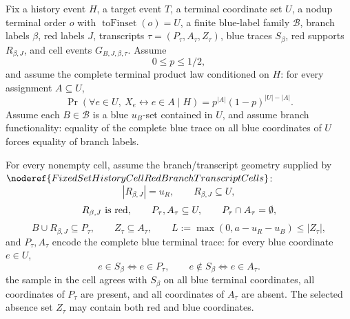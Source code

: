\begin{helper}
Fix a history event \(H\), a target event \(T\), a terminal coordinate set
\(U\), a nodup terminal order \(o\) with \(\operatorname{toFinset}(o)=U\),
a finite blue-label family \({\mathcal B}\), branch labels
\(\beta\), red labels \(J\), transcripts
\(\tau=(P_\tau,A_\tau,Z_\tau)\), blue traces \(S_\beta\), red supports
\(R_{\beta,J}\), and cell events \(G_{B,J,\beta,\tau}\).  Assume
\[
0\le p\le 1/2,
\]
and assume the complete terminal product law conditioned on \(H\): for every
assignment \(A\subseteq U\),
\[
\Pr(\forall e\in U,\ X_e\leftrightarrow e\in A\mid H)
=p^{|A|}(1-p)^{|U|-|A|}.
\]
Assume each \(B\in{\mathcal B}\) is a blue \(u_B\)-set contained in \(U\),
and assume branch functionality: equality of the complete blue trace on all
blue coordinates of \(U\) forces equality of branch labels.

For every nonempty cell, assume the branch/transcript geometry supplied by
\(\noderef{FixedSetHistoryCellRedBranchTranscriptCells}\):
\[
|R_{\beta,J}|=u_R,\qquad R_{\beta,J}\subseteq U,
\]
\[
R_{\beta,J}\hbox{ is red},\qquad
P_\tau,A_\tau\subseteq U,\qquad P_\tau\cap A_\tau=\emptyset,
\]
\[
B\cup R_{\beta,J}\subseteq P_\tau,\qquad
Z_\tau\subseteq A_\tau,\qquad
L:=\max(0,a-u_R-u_B)\le |Z_\tau|,
\]
and \(P_\tau,A_\tau\) encode the complete blue terminal trace: for every
blue coordinate \(e\in U\),
\[
e\in S_\beta\Longleftrightarrow e\in P_\tau,\qquad
e\notin S_\beta\Longleftrightarrow e\in A_\tau.
\]
the sample in the cell agrees with \(S_\beta\) on all blue terminal
coordinates, all coordinates of \(P_\tau\) are present, and all coordinates
of \(A_\tau\) are absent.  The selected absence set \(Z_\tau\) may contain
both red and blue coordinates.


\end{helper}
